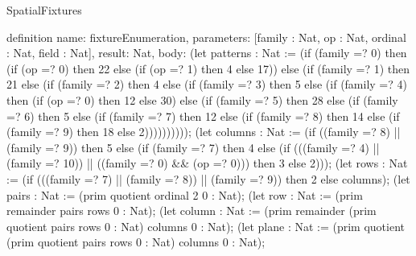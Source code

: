 \begin{lexlean}{SpatialFixtures}
\begin{semanticmodule}
definition{
  name: fixtureEnumeration,
  parameters: [family : Nat, op : Nat, ordinal : Nat, field : Nat],
  result: Nat,
  body: (let patterns : Nat := (if (family =? 0) then (if (op =? 0) then 22 else (if (op =? 1) then 4 else 17)) else (if (family =? 1) then 21 else (if (family =? 2) then 4 else (if (family =? 3) then 5 else (if (family =? 4) then (if (op =? 0) then 12 else 30) else (if (family =? 5) then 28 else (if (family =? 6) then 5 else (if (family =? 7) then 12 else (if (family =? 8) then 14 else (if (family =? 9) then 18 else 2))))))))));
      (let columns : Nat := (if ((family =? 8) || (family =? 9)) then 5 else (if (family =? 7) then 4 else (if (((family =? 4) || (family =? 10)) || ((family =? 0) && (op =? 0))) then 3 else 2)));
      (let rows : Nat := (if (((family =? 7) || (family =? 8)) || (family =? 9)) then 2 else columns);
      (let pairs : Nat := (prim quotient ordinal 2 0 : Nat);
      (let row : Nat := (prim remainder pairs rows 0 : Nat);
      (let column : Nat := (prim remainder (prim quotient pairs rows 0 : Nat) columns 0 : Nat);
      (let plane : Nat := (prim quotient (prim quotient pairs rows 0 : Nat) columns 0 : Nat);
}
\end{semanticmodule}
\end{lexlean}
